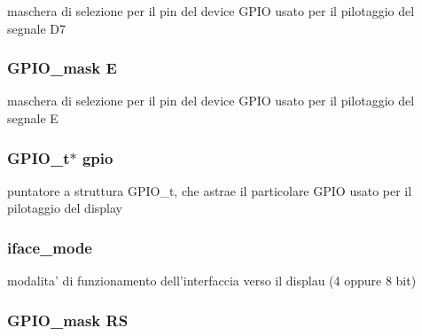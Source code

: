 maschera di selezione per il pin del device G\+P\+I\+O usato per il pilotaggio del segnale D7 \hypertarget{struct_h_d44780___l_c_d__t_a851ed1cefdadae2e5069d1364ae8fc9e}{
\subsubsection[{E}]{\setlength{\rightskip}{0pt plus 5cm}G\+P\+I\+O\+\_\+mask E}}\label{struct_h_d44780___l_c_d__t_a851ed1cefdadae2e5069d1364ae8fc9e}
maschera di selezione per il pin del device G\+P\+I\+O usato per il pilotaggio del segnale E \hypertarget{struct_h_d44780___l_c_d__t_acb3116190992a4d8d26545c103304d27}{
\subsubsection[{gpio}]{\setlength{\rightskip}{0pt plus 5cm}G\+P\+I\+O\+\_\+t$\ast$ gpio}}\label{struct_h_d44780___l_c_d__t_acb3116190992a4d8d26545c103304d27}
puntatore a struttura G\+P\+I\+O\+\_\+t, che astrae il particolare G\+P\+I\+O usato per il pilotaggio del display \hypertarget{struct_h_d44780___l_c_d__t_a7c5a51b8cc5de5ee2cf42b884bd1bc67}{
\subsubsection[{iface\+\_\+mode}]{ iface\+\_\+mode}}\label{struct_h_d44780___l_c_d__t_a7c5a51b8cc5de5ee2cf42b884bd1bc67}
modalita' di funzionamento dell'interfaccia verso il displau (4 oppure 8 bit) \hypertarget{struct_h_d44780___l_c_d__t_a142ae0db638dca7ab42e2183a1311d32}{
\subsubsection[{R\+S}]{\setlength{\rightskip}{0pt plus 5cm}G\+P\+I\+O\+\_\+mask R\+S}}\label{struct_h_d44780___l_c_d__t_a142ae0db638dca7ab42e2183a1311d32}
